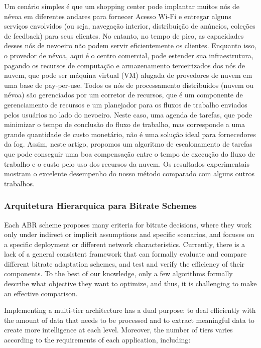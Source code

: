 Um cenário simples é que um shopping center pode implantar muitos nós de névoa em diferentes andares para fornecer Acesso Wi-Fi e entregar alguns serviços envolvidos (ou seja, navegação interior, distribuição de anúncios, coleções de feedback) para seus clientes. No entanto, no tempo de pico, as capacidades desses nós de nevoeiro não podem servir eficientemente os clientes. Enquanto isso, o provedor de névoa, aqui é o centro comercial, pode estender sua infraestrutura, pagando os recursos de computação e armazenamento terceirizados dos nós de nuvem, que pode ser máquina virtual (VM) alugada de provedores de nuvem em uma base de pay-per-use. Todos os nós de processamento distribuídos (nuvem ou névoa) são gerenciados por um corretor de recursos, que é um componente de gerenciamento de recursos e um planejador para os fluxos de trabalho enviados pelos usuários no lado do nevoeiro. Neste caso, uma agenda de tarefas, que pode minimizar o tempo de conclusão do fluxo de trabalho, mas corresponde a uma grande quantidade de custo monetário, não é uma solução ideal para fornecedores da fog. Assim, neste artigo, propomos um algoritmo de escalonamento de tarefas que pode conseguir uma boa compensação entre o tempo de execução do fluxo de trabalho e o custo pelo uso dos recursos da nuvem. Os resultados experimentais mostram o excelente desempenho do nosso método comparado com alguns outros trabalhos.	



\subsubsection{Arquitetura Hierarquica para Bitrate Schemes}
\label{subsec:bitrate-schemes}

Each ABR scheme proposes many criteria for bitrate decisions, where they work only under
indirect or implicit assumptions and specific scenarios, and focuses on a specific deployment or
different network characteristics. Currently, there is a lack of a general consistent framework
that can formally evaluate and compare different bitrate adaptation schemes, and test and
verify the efficiency of their components. To the best of our knowledge, only a few algorithms
formally describe what objective they want to optimize, and thus, it is challenging to make
an effective comparison.

Implementing a multi-tier architecture has a dual purpose: to deal efficiently with the amount
of data that needs to be processed and to extract meaningful data to create more intelligence at
each level. Moreover, the number of tiers varies according to the requirements of each application,
including:

